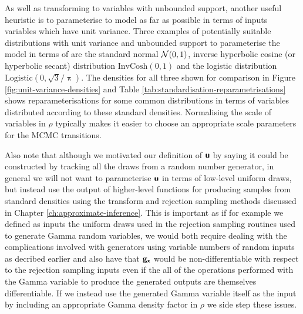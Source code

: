 As well as transforming to variables with unbounded support, another useful heuristic is to parameterise to model as far as possible in terms of inputs variables which have unit variance. Three examples of potentially suitable distributions with unit variance and unbounded support to parameterise the model in terms of are the standard normal $\nrm{0,1}$, inverse hyperbolic cosine (or hyperbolic secant) distribution $\textrm{InvCosh}(0,1)$ and the logistic distribution $\textrm{Logistic}(0,\sqrt{3}/\uppi)$. The densities for all three shown for comparison in Figure \ref{fig:unit-variance-densities} and Table \ref{tab:standardisation-reparametrisations} shows reparameterisations for some common distributions in terms of variables distributed according to these standard densities. Normalising the scale of variables in $\rho$ typically makes it easier to choose an appropriate scale parameters for the \ac{MCMC} transitions. %

Also note that although we motivated our definition of $\boldsymbol{\mathsf{u}}$ by saying it could be constructed by tracking all the draws from a random number generator, in general we will not want to parameterise $\boldsymbol{\mathsf{u}}$ in terms of low-level uniform draws, but instead use the output of higher-level functions for producing samples from standard densities using the transform and rejection sampling methods discussed in Chapter \ref{ch:approximate-inference}. This is important as if for example we defined as inputs the uniform draws used in the rejection sampling routines used to generate Gamma random variables, we would both require dealing with the complications involved with generators using variable numbers of random inputs as decribed earlier and also have that ${\mathbf{g}}_{\boldsymbol{\mathsf{x}}}$ would be non-differentiable with respect to the rejection sampling inputs even if the all of the operations performed with the Gamma variable to produce the generated outputs are themselves differentiable. If we instead use the generated Gamma variable itself as the input by including an appropriate Gamma density factor in $\rho$ we side step these issues. 


